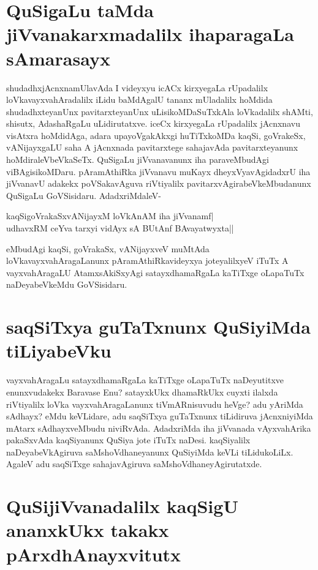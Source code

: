 \section*{QuSigaLu taMda jiVvanakarxmadalilx ihaparagaLa sAmarasayx}

shudadhxjAcnxnamUlavAda I videyxyu icACx kirxyegaLa rUpadalilx loVkavayxvahAradalilx iLidu baMdAgalU tananx mUladalilx hoMdida shudadhxteyanUnx pavitarxteyanUnx uLisikoMDaSuTxkAla loVkadalilx shAMti, shisutx, AdashaRgaLu uLidirutatxve. iceCx kirxyegaLa rUpadalilx jAcnxnavu visAtxra hoMdidAga, adara upayoVgakAkxgi huTiTxkoMDa kaqSi, goVrakeSx, vANijayxgaLU saha A jAcnxnada pavitarxtege sahajavAda pavitarxteyanunx hoMdiraleVbeVkaSeTx. QuSigaLu jiVvanavanunx iha paraveMbudAgi viBAgisikoMDaru. pAramAthiRka jiVvanavu muKayx dheyxVyavAgidadxrU iha jiVvanavU adakekx poVSakavAguva riVtiyalilx pavitarxvAgirabeVkeMbudanunx QuSigaLu GoVSisidaru. AdadxriMdaleV-

\begin{shloka}
kaqSigoVrakaSxvANijayxM loVkAnAM iha jiVvanamf|\label{75}\\
udhavxRM ceYva tarxyi vidAyx sA BUtAnf BAvayatwyxta||
\end{shloka}

eMbudAgi kaqSi, goVrakaSx, vANijayxveV muMtAda loVkavayxvahAragaLanunx pAramAthiRkavideyxya joteyalilxyeV iTuTx A vayxvahAragaLU AtamxsAkiSxyAgi satayxdhamaRgaLa kaTiTxge oLapaTuTx naDeyabeVkeMdu GoVSisidaru.

\section*{saqSiTxya guTaTxnunx QuSiyiMda tiLiyabeVku}

vayxvahAragaLu satayxdhamaRgaLa kaTiTxge oLapaTuTx naDeyutitxve enunxvudakekx Baravase Enu? satayxkUkx dhamaRkUkx cuyxti ilalxda riVtiyalilx loVka vayxvahAragaLanunx tiVmARnisuvudu heVge? adu yAriMda sAdhayx? eMdu keVLidare, adu saqSiTxya guTaTxnunx tiLidiruva jAcnxniyiMda mAtarx sAdhayxveMbudu niviRvAda. AdadxriMda iha jiVvanada vAyxvahArika pakaSxvAda kaqSiyanunx QuSiya jote iTuTx naDesi. kaqSiyalilx naDeyabeVkAgiruva saMshoVdhaneyanunx QuSiyiMda keVLi tiLidukoLiLx. AgaleV adu saqSiTxge sahajavAgiruva saMshoVdhaneyAgirutatxde.

\section*{QuSijiVvanadalilx kaqSigU ananxkUkx takakx pArxdhAnayxvitutx}

